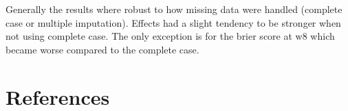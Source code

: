 \documentclass[12pt]{article}
\begin{document}
\bigskip

Generally the results where robust to how missing data were handled
  (complete case or multiple imputation). Effects had a slight
  tendency to be stronger when not using complete case. The only
  exception is for the brier score at w8 which became worse compared
  to the complete case.  \bigskip


\section{References}
\label{sec:org2d2c201}
\begingroup
\renewcommand{\section}[2]{}



\endgroup
\end{document}
